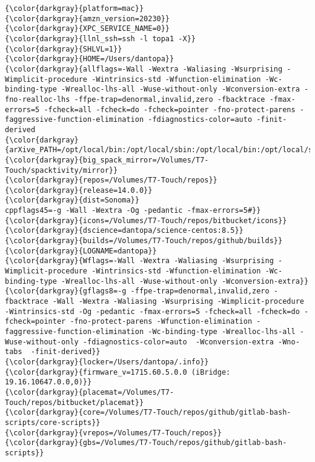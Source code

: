 {{\begin{Verbatim}[commandchars=\\\{\}]
{\color{darkgray}{platform=mac}}
{\color{darkgray}{amzn_version=20230}}
{\color{darkgray}{XPC_SERVICE_NAME=0}}
{\color{darkgray}{llnl_ssh=ssh -l topa1 -X}}
{\color{darkgray}{SHLVL=1}}
{\color{darkgray}{HOME=/Users/dantopa}}
{\color{darkgray}{allflags=-Wall -Wextra -Waliasing -Wsurprising -Wimplicit-procedure -Wintrinsics-std -Wfunction-elimination -Wc-binding-type -Wrealloc-lhs-all -Wuse-without-only -Wconversion-extra -fno-realloc-lhs -ffpe-trap=denormal,invalid,zero -fbacktrace -fmax-errors=5 -fcheck=all -fcheck=do -fcheck=pointer -fno-protect-parens -faggressive-function-elimination -fdiagnostics-color=auto -finit-derived
{\color{darkgray}{arXive_PATH=/opt/local/bin:/opt/local/sbin:/opt/local/bin:/opt/local/sbin:/usr/local/bin:/System/Cryptexes/App/usr/bin:/usr/bin:/bin:/usr/sbin:/sbin:/var/run/com.apple.security.cryptexd/codex.system/bootstrap/usr/local/bin:/var/run/com.apple.security.cryptexd/codex.system/bootstrap/usr/bin:/var/run/com.apple.security.cryptexd/codex.system/bootstrap/usr/appleinternal/bin:/opt/X11/bin:/Library/Apple/usr/bin:/Library/TeX/texbin:/opt/podman/bin:/Users/dantopa/.cabal/bin:/Users/dantopa/.ghcup/bin}}
{\color{darkgray}{big_spack_mirror=/Volumes/T7-Touch/spacktivity/mirror}}
{\color{darkgray}{repos=/Volumes/T7-Touch/repos}}
{\color{darkgray}{release=14.0.0}}
{\color{darkgray}{dist=Sonoma}}
cppflags45=-g -Wall -Wextra -Og -pedantic -fmax-errors=5#}}
{\color{darkgray}{icons=/Volumes/T7-Touch/repos/bitbucket/icons}}
{\color{darkgray}{dscience=dantopa/science-centos:8.5}}
{\color{darkgray}{builds=/Volumes/T7-Touch/repos/github/builds}}
{\color{darkgray}{LOGNAME=dantopa}}
{\color{darkgray}{Wflags=-Wall -Wextra -Waliasing -Wsurprising -Wimplicit-procedure -Wintrinsics-std -Wfunction-elimination -Wc-binding-type -Wrealloc-lhs-all -Wuse-without-only -Wconversion-extra}}
{\color{darkgray}{gflags8=-g -ffpe-trap=denormal,invalid,zero -fbacktrace -Wall -Wextra -Waliasing -Wsurprising -Wimplicit-procedure -Wintrinsics-std -Og -pedantic -fmax-errors=5 -fcheck=all -fcheck=do -fcheck=pointer -fno-protect-parens -Wfunction-elimination -faggressive-function-elimination -Wc-binding-type -Wrealloc-lhs-all -Wuse-without-only -fdiagnostics-color=auto  -Wconversion-extra -Wno-tabs  -finit-derived}}
{\color{darkgray}{locker=/Users/dantopa/.info}}
{\color{darkgray}{firmware_v=1715.60.5.0.0 (iBridge: 19.16.10647.0.0,0)}}
{\color{darkgray}{placemat=/Volumes/T7-Touch/repos/bitbucket/placemat}}
{\color{darkgray}{core=/Volumes/T7-Touch/repos/github/gitlab-bash-scripts/core-scripts}}
{\color{darkgray}{vrepos=/Volumes/T7-Touch/repos}}
{\color{darkgray}{gbs=/Volumes/T7-Touch/repos/github/gitlab-bash-scripts}}

\end{Verbatim}}}
